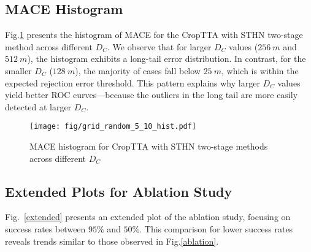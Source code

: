 \subsection{MACE Histogram}\label{histogram} Fig.\ref{hist} presents the histogram of MACE for the CropTTA with STHN two-stage method across different $D_C$. We observe that for larger $D_C$ values ($256~\si{m}$ and $512~\si{m}$), the histogram exhibits a long-tail error distribution. In contrast, for the smaller $D_C$ ($128~\si{m}$), the majority of cases fall below $25~\si{m}$, which is within the expected rejection error threshold. This pattern explains why larger $D_C$ values yield better ROC curves—because the outliers in the long tail are more easily detected at larger $D_C$.

\begin{figure}
    \centering
    \texttt{[image: fig/grid\_random\_5\_10\_hist.pdf]}
    \caption{MACE histogram for CropTTA with STHN two-stage methods across different $D_C$}
    \label{hist}
\end{figure}

\subsection{Extended Plots for Ablation Study}\label{extended_ab} Fig.~\ref{extended} presents an extended plot of the ablation study, focusing on success rates between $95\%$ and $50\%$. This comparison for lower success rates reveals trends similar to those observed in Fig.\ref{ablation}.

